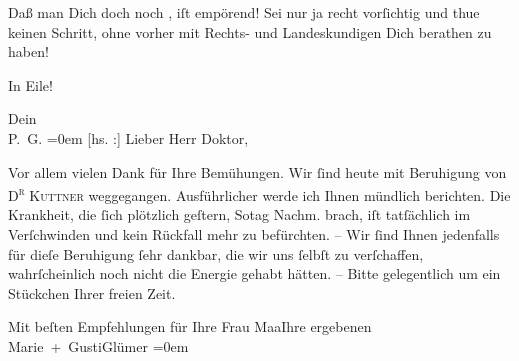 \pstart
           Daß man Dich doch noch \label{K_L03056-4v}\label{K_L03056-4}, iſt {\pb}empörend! Sei nur ja recht vorſichtig und thue
               keinen Schritt, ohne vorher mit Rechts- und Landeskundigen Dich berathen zu
               haben!\pend
           
\pstart
           In Eile!\pend
           
\pstart
           Dein {\\[\baselineskip]}\spacefill\mbox{P. G.}\pend
           \leftskip=0em{}\vspace{1em}{\vspace{1\baselineskip}}
\pstart
           {\pb}{[}hs. :{]} Lieber Herr Doktor,\pend
           
\pstart
           Vor allem vielen Dank für Ihre Bemühungen. Wir ſind heute mit Beruhigung
               von \textsc{D\textsuperscript{r}}{ }\textsc{Kuttner} weggegangen. Ausführlicher werde ich Ihnen mündlich berichten. Die Krankheit,
               die {\pb}ſich plötzlich geſtern, So{\geminationn}tag{ }Nachm. brach, iſt tatſächlich im Verſchwinden und kein Rückfall mehr zu befürchten. – Wir ſind Ihnen
               jedenfalls für dieſe Beruhigung ſehr dankbar, die wir uns ſelbſt zu verſchaffen, {\pb}wahrſcheinlich noch nicht die Energie gehabt hätten.
               – Bitte gelegentlich um ein Stückchen Ihrer freien Zeit.\pend
           
\pstart
           Mit beſten Empfehlungen für Ihre Frau Ma{\geminationm}aIhre ergebenen {\\[\baselineskip]}\spacefill\mbox{Marie + GustiGlümer}\pend
           \leftskip=0em{}\endnumbering{}  
      